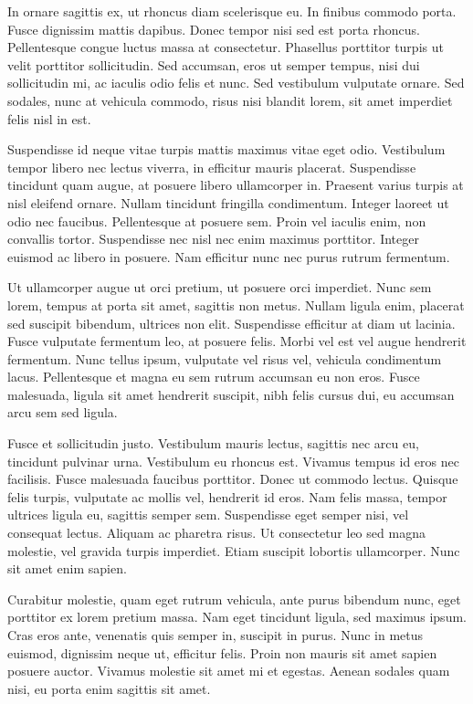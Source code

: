 \documentclass[11pt,]{article}
\begin{document}
In ornare sagittis ex, ut rhoncus diam scelerisque eu. In finibus
commodo porta. Fusce dignissim mattis dapibus. Donec tempor nisi sed est
porta rhoncus. Pellentesque congue luctus massa at consectetur.
Phasellus porttitor turpis ut velit porttitor sollicitudin. Sed
accumsan, eros ut semper tempus, nisi dui sollicitudin mi, ac iaculis
odio felis et nunc. Sed vestibulum vulputate ornare. Sed sodales, nunc
at vehicula commodo, risus nisi blandit lorem, sit amet imperdiet felis
nisl in est.

Suspendisse id neque vitae turpis mattis maximus vitae eget odio.
Vestibulum tempor libero nec lectus viverra, in efficitur mauris
placerat. Suspendisse tincidunt quam augue, at posuere libero
ullamcorper in. Praesent varius turpis at nisl eleifend ornare. Nullam
tincidunt fringilla condimentum. Integer laoreet ut odio nec faucibus.
Pellentesque at posuere sem. Proin vel iaculis enim, non convallis
tortor. Suspendisse nec nisl nec enim maximus porttitor. Integer euismod
ac libero in posuere. Nam efficitur nunc nec purus rutrum fermentum.

Ut ullamcorper augue ut orci pretium, ut posuere orci imperdiet. Nunc
sem lorem, tempus at porta sit amet, sagittis non metus. Nullam ligula
enim, placerat sed suscipit bibendum, ultrices non elit. Suspendisse
efficitur at diam ut lacinia. Fusce vulputate fermentum leo, at posuere
felis. Morbi vel est vel augue hendrerit fermentum. Nunc tellus ipsum,
vulputate vel risus vel, vehicula condimentum lacus. Pellentesque et
magna eu sem rutrum accumsan eu non eros. Fusce malesuada, ligula sit
amet hendrerit suscipit, nibh felis cursus dui, eu accumsan arcu sem sed
ligula.

Fusce et sollicitudin justo. Vestibulum mauris lectus, sagittis nec arcu
eu, tincidunt pulvinar urna. Vestibulum eu rhoncus est. Vivamus tempus
id eros nec facilisis. Fusce malesuada faucibus porttitor. Donec ut
commodo lectus. Quisque felis turpis, vulputate ac mollis vel, hendrerit
id eros. Nam felis massa, tempor ultrices ligula eu, sagittis semper
sem. Suspendisse eget semper nisi, vel consequat lectus. Aliquam ac
pharetra risus. Ut consectetur leo sed magna molestie, vel gravida
turpis imperdiet. Etiam suscipit lobortis ullamcorper. Nunc sit amet
enim sapien.

Curabitur molestie, quam eget rutrum vehicula, ante purus bibendum nunc,
eget porttitor ex lorem pretium massa. Nam eget tincidunt ligula, sed
maximus ipsum. Cras eros ante, venenatis quis semper in, suscipit in
purus. Nunc in metus euismod, dignissim neque ut, efficitur felis. Proin
non mauris sit amet sapien posuere auctor. Vivamus molestie sit amet mi
et egestas. Aenean sodales quam nisi, eu porta enim sagittis sit amet.
\end{document}
